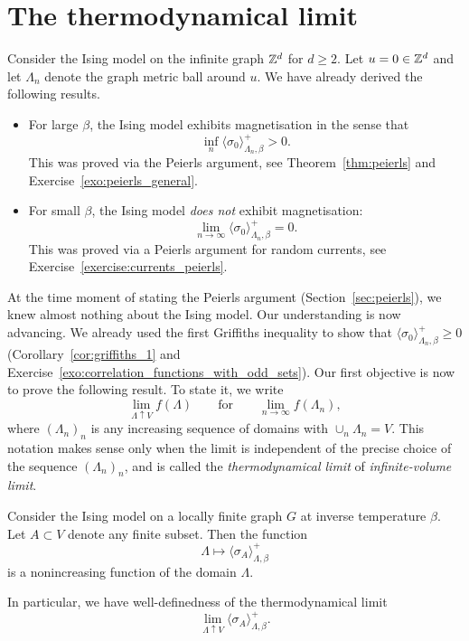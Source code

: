 \section{The thermodynamical limit}
\label{sec:infinite_volume}

Consider the Ising model on the infinite graph $\mathbb Z^d$ for $d\geq 2$.
Let $u=0\in\mathbb Z^d$ and let $\Lambda_n$ denote the graph metric ball around $u$.
We have already derived the following results.
\begin{itemize}
    \item For large $\beta$,
    the Ising model exhibits magnetisation
    in the sense that
    \[
        \inf_{n}\langle\sigma_0\rangle_{\Lambda_n,\beta}^+
        >0.
    \]
    This was proved via the Peierls argument, see Theorem~\ref{thm:peierls}
    and Exercise~\ref{exo:peierls_general}.
    \item For small $\beta$,
    the Ising model \emph{does not} exhibit magnetisation:
    \[
        \lim_{n\to\infty}\langle\sigma_0\rangle_{\Lambda_n,\beta}^+
        =0.
    \]
    This was proved via a Peierls argument for random currents,
    see Exercise~\ref{exercise:currents_peierls}.
\end{itemize}
At the time moment of stating the Peierls argument (Section~\ref{sec:peierls}),
we knew almost nothing about the Ising model.
Our understanding is now advancing.
We already used the first Griffiths inequality to show that $\langle\sigma_0\rangle_{\Lambda_n,\beta}^+\geq 0$
(Corollary~\ref{cor:griffiths_1}
and Exercise~\ref{exo:correlation_functions_with_odd_sets}).
Our first objective is now to prove the following result.
To state it, we write
\[
    \lim_{\Lambda\uparrow V}f(\Lambda)
    \qquad\text{for}\qquad
    \lim_{n\to\infty}f(\Lambda_n),
\]
where $(\Lambda_n)_n$ is any increasing sequence of domains 
with $\cup_n\Lambda_n=V$.
This notation makes sense only when the limit is independent
of the precise choice of the sequence $(\Lambda_n)_n$,
and is called the \emph{thermodynamical limit} of \emph{infinite-volume limit}.

\begin{lemma}
    \label{lemma:correlation_functions_monotone}
    Consider the Ising model on a locally finite graph
    $G$ at inverse temperature $\beta$.
    Let $A\subset V$ denote any finite subset.
    Then the function
    \[
        \Lambda\mapsto
        \langle\sigma_A\rangle_{\Lambda,\beta}^+
    \]
    is a nonincreasing function of the domain $\Lambda$.

    In particular, we have well-definedness of the thermodynamical limit
    \[
        \lim_{\Lambda\uparrow V}
        \langle\sigma_A\rangle_{\Lambda,\beta}^+.
    \]
\end{lemma}

